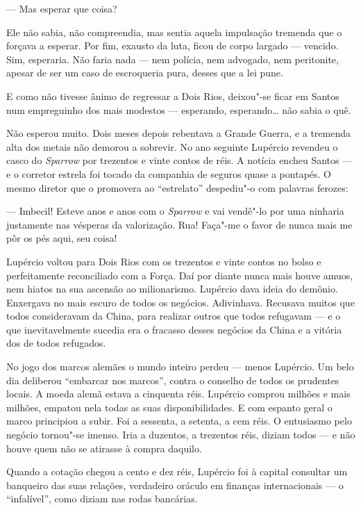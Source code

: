 --- Mas esperar que coisa?

Ele não sabia, não compreendia, mas sentia aquela impulsação tremenda
que o forçava a esperar. Por fim, exausto da luta, ficou de corpo
largado --- vencido. Sim, esperaria. Não faria nada --- nem polícia, nem
advogado, nem peritonite, apesar de ser um caso de escroqueria pura,
desses que a lei pune.

E como não tivesse ânimo de regressar a Dois Rios, deixou"-se ficar em
Santos num empreguinho dos mais modestos --- esperando, esperando\ldots{} não
sabia o quê.

Não esperou muito. Dois meses depois rebentava a Grande Guerra, e a
tremenda alta dos metais não demorou a sobrevir. No ano seguinte
Lupércio revendeu o casco do \emph{Sparrow} por trezentos e vinte contos
de réis. A notícia encheu Santos --- e o corretor estrela foi tocado da
companhia de seguros quase a pontapés. O mesmo diretor que o promovera
ao ``estrelato'' despediu"-o com palavras ferozes:

--- Imbecil! Esteve anos e anos com o \emph{Sparrow} e vai vendê"-lo por
uma ninharia justamente nas vésperas da valorização. Rua! Faça"-me o
favor de nunca mais me pôr os pés aqui, seu coisa!

Lupércio voltou para Dois Rios com os trezentos e vinte contos no bolso
e perfeitamente reconciliado com a Força. Daí por diante nunca mais
houve amuos, nem hiatos na sua ascensão ao milionarismo. Lupércio dava
ideia do demônio. Enxergava no mais escuro de todos os negócios.
Adivinhava. Recusava muitos que todos consideravam da China, para
realizar outros que todos refugavam --- e o que inevitavelmente sucedia
era o fracasso desses negócios da China e a vitória dos de todos
refugados.

No jogo dos marcos alemães o mundo inteiro perdeu --- menos Lupércio. Um
belo dia deliberou ``embarcar nos marcos'', contra o conselho de todos
os prudentes locais. A moeda alemã estava a cinquenta réis. Lupércio
comprou milhões e mais milhões, empatou nela todas as suas
disponibilidades. E com espanto geral o marco principiou a subir. Foi a
sessenta, a setenta, a cem réis. O entusiasmo pelo negócio tornou"-se
imenso. Iria a duzentos, a trezentos réis, diziam todos --- e não houve
quem não se atirasse à compra daquilo.

Quando a cotação chegou a cento e dez réis, Lupércio foi à capital
consultar um banqueiro das suas relações, verdadeiro oráculo em finanças
internacionais --- o ``infalível'', como diziam nas rodas bancárias.


